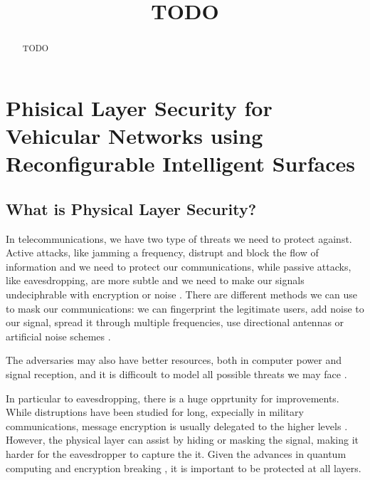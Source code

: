 \documentclass[conference]{IEEEtran}
\begin{document}
\title{TODO}


\author{
}

\maketitle

\begin{abstract}
  TODO
\end{abstract}


\IEEEpeerreviewmaketitle

\section{Phisical Layer Security for Vehicular Networks using Reconfigurable Intelligent Surfaces}
\subsection{What is Physical Layer Security?}

In telecommunications, we have two type of threats we need to protect against. Active attacks, like jamming a frequency, distrupt and block the flow of information and we need to protect our communications, while passive attacks, like eavesdropping, are more subtle and we need to make our signals undeciphrable with encryption or noise \cite{5751298}. There are different methods we can use to mask our communications: we can fingerprint the legitimate users, add noise to our signal, spread it through multiple frequencies, use directional antennas or artificial noise schemes \cite{5751298}.

The adversaries may also have better resources, both in computer power and signal reception, and it is difficoult to model all possible threats we may face \cite{7120011}.

In particular to eavesdropping, there is a huge opprtunity for improvements. While distruptions have been studied for long, expecially in military communications, message encryption is usually delegated to the higher levels \cite{6739367}. However, the physical layer can assist by hiding or masking the signal, making it harder for the eavesdropper to capture the it. Given the advances in quantum computing and encryption breaking \cite{365700}, it is important to be protected at all layers.
\end{document}
